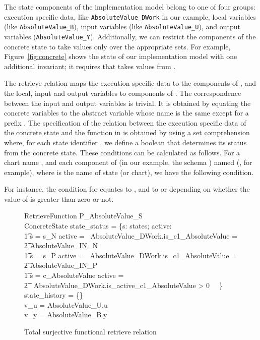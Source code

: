 \documentclass[submission]{eptcs}
\begin{document}
The state components of the implementation model belong to one of four groups: execution specific data, like \texttt{AbsoluteValue\_DWork} in our example, local variables (like \texttt{AbsoluteValue\_B}), input variables (like \texttt{AbsoluteValue\_U}), and output variables (\texttt{AbsoluteValue\_Y}). Additionally, we can restrict the components of the concrete state to take values only over the appropriate sets. For example, Figure~\ref{fig:concrete} shows the state of our implementation model with one additional invariant; it requires that  takes values from .

The retrieve relation maps the execution specific data to the components of , and the local, input and output variables to components of . The correspondence between the input and output variables is trivial. It is obtained by equating the concrete variables to the abstract variable whose name is the same except for a prefix . The specification of the relation between the execution specific data of the concrete state and the function  in  is obtained by using a set comprehension where, for each state identifier , we define a boolean  that determines its status from the concrete state. These conditions can be calculated as follows. For a chart name , and each component of  (in our example, the schema
) named  (, for example), where  is the name of state (or chart), we have the following condition.

For instance, the condition for  equates  to , and  to  or  depending on whether the value of  is greater than zero or not.


\begin{figure}
\begin{schema}{RetrieveFunction}
P\_AbsoluteValue\_S\\
ConcreteState
\where
state\_status = \{s: \dom states; active: \boolean \circspot\\\t1
s = s\_N \land active = \IF~AbsoluteValue\_DWork.is\_c1\_AbsoluteValue = \\
\t2 AbsoluteValue\_IN\_N \THEN \true \ELSE~\false \lor\\\t1
s = s\_P \land active = \IF~AbsoluteValue\_DWork.is\_c1\_AbsoluteValue =\\
\t2 AbsoluteValue\_IN\_P \THEN \true \ELSE~\false\lor\\\t1
s = c\_AbsoluteValue \land active =\\
\t2 \IF~AbsoluteValue\_DWork.is\_active\_c1\_AbsoluteValue > 0 \THEN~\true \ELSE~\false\}\\
state\_history = \{\}\\
v\_u = AbsoluteValue\_U.u\\
v\_y = AbsoluteValue\_B.y
\end{schema}
\caption{Total surjective functional retrieve relation}
\label{fig:retrieve}
\end{figure}
\end{document}
